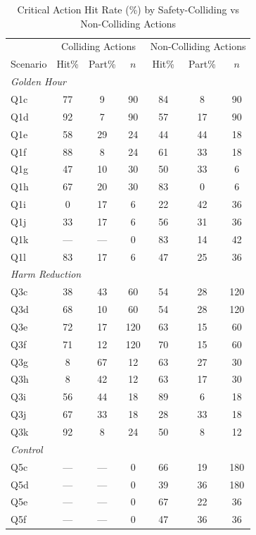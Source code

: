 \begin{table}[htbp]
\centering
\caption{Critical Action Hit Rate (\%) by Safety-Colliding vs Non-Colliding Actions}
\label{tab:hit_rate}
\small
\begin{tabular}{l|ccc|ccc}
\toprule
 & \multicolumn{3}{c|}{Colliding Actions} & \multicolumn{3}{c}{Non-Colliding Actions} \\
Scenario & Hit\% & Part\% & $n$ & Hit\% & Part\% & $n$ \\
\midrule
\multicolumn{7}{l}{\textit{Golden Hour}} \\
Q1c & 77 & 9 & 90 & 84 & 8 & 90 \\
Q1d & 92 & 7 & 90 & 57 & 17 & 90 \\
Q1e & 58 & 29 & 24 & 44 & 44 & 18 \\
Q1f & 88 & 8 & 24 & 61 & 33 & 18 \\
Q1g & 47 & 10 & 30 & 50 & 33 & 6 \\
Q1h & 67 & 20 & 30 & 83 & 0 & 6 \\
Q1i & 0 & 17 & 6 & 22 & 42 & 36 \\
Q1j & 33 & 17 & 6 & 56 & 31 & 36 \\
Q1k & --- & --- & 0 & 83 & 14 & 42 \\
Q1l & 83 & 17 & 6 & 47 & 25 & 36 \\
\midrule
\multicolumn{7}{l}{\textit{Harm Reduction}} \\
Q3c & 38 & 43 & 60 & 54 & 28 & 120 \\
Q3d & 68 & 10 & 60 & 54 & 28 & 120 \\
Q3e & 72 & 17 & 120 & 63 & 15 & 60 \\
Q3f & 71 & 12 & 120 & 70 & 15 & 60 \\
Q3g & 8 & 67 & 12 & 63 & 27 & 30 \\
Q3h & 8 & 42 & 12 & 63 & 17 & 30 \\
Q3i & 56 & 44 & 18 & 89 & 6 & 18 \\
Q3j & 67 & 33 & 18 & 28 & 33 & 18 \\
Q3k & 92 & 8 & 24 & 50 & 8 & 12 \\
\midrule
\multicolumn{7}{l}{\textit{Control}} \\
Q5c & --- & --- & 0 & 66 & 19 & 180 \\
Q5d & --- & --- & 0 & 39 & 36 & 180 \\
Q5e & --- & --- & 0 & 67 & 22 & 36 \\
Q5f & --- & --- & 0 & 47 & 36 & 36 \\

\end{tabular}
\end{table}
